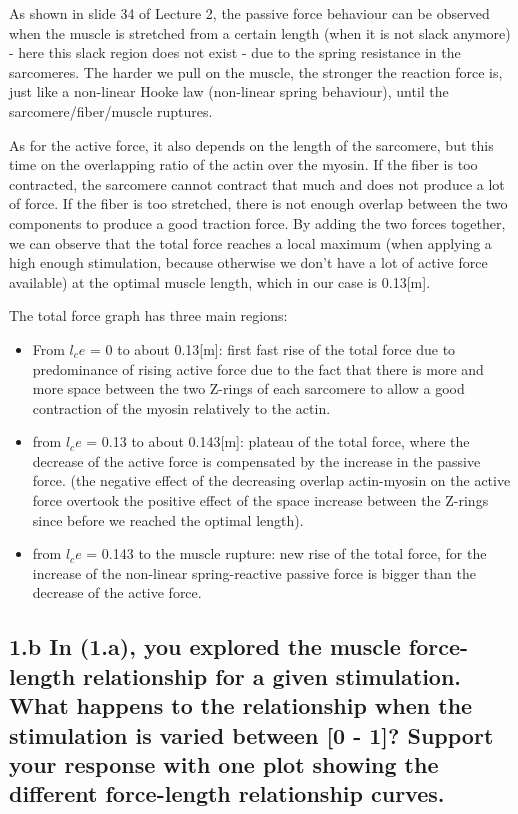 \documentclass{cmc}
\begin{document}
    As shown in slide 34 of Lecture 2, the passive force behaviour can be observed when the muscle is stretched from a certain length (when it is not slack anymore) - here this slack region does not exist - due to the spring resistance in the sarcomeres. The harder we pull on the muscle, the stronger the reaction force is, just like a non-linear Hooke law (non-linear spring behaviour), until the sarcomere/fiber/muscle ruptures.
    
    As for the active force, it also depends on the length of the sarcomere, but this time on the overlapping ratio of the actin over the myosin. If the fiber is too contracted, the sarcomere cannot contract that much and does not produce a lot of force. If the fiber is too stretched, there is not enough overlap between the two components to produce a good traction force.
    By adding the two forces together, we can observe that the total force reaches a local maximum (when applying a high enough stimulation, because otherwise we don't have a lot of active force available) at the optimal muscle length, which in our case is 0.13[m].
    
    The total force graph has three main regions:
    \begin{itemize}
        \item From $l_ce$ = 0 to about 0.13[m]: first fast rise of the total force due to predominance of rising active force due to the fact that there is more and more space between the two Z-rings of each sarcomere to allow a good contraction of the myosin relatively to the actin.
        \item from $l_ce$ = 0.13 to about 0.143[m]: plateau of the total force, where the decrease of the active force is compensated by the increase in the passive force.
        (the negative effect of the decreasing overlap actin-myosin on the active force overtook the positive effect of the space increase between the Z-rings since before we reached the optimal length).
        \item from $l_ce$ = 0.143 to the muscle rupture: new rise of the total force, for the increase of the non-linear spring-reactive passive force is bigger than the decrease of the active force.
    \end{itemize}
    

\subsection*{1.b In (1.a), you explored the muscle force-length
  relationship for a given stimulation. What happens to the
  relationship when the stimulation is varied between [0 - 1]? Support
  your response with one plot showing the different force-length
  relationship curves.}
\end{document}

